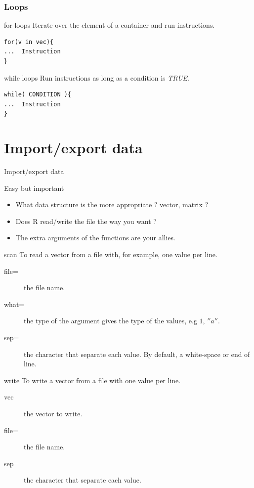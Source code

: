 \documentclass[10pt]{beamer}
\newenvironment{xframe}[2][]
  {\begin{frame}[fragile,environment=xframe,#1]
  \frametitle{#2}}
  {\end{frame}}
\begin{document}

\begin{xframe}{Loops}
  \begin{block}{{\sf for} loops}
    Iterate over the element of a container and run instructions.
\begin{verbatim}
for(v in vec){
...  Instruction
}
\end{verbatim}  
  \end{block}
  \begin{block}{{\sf while} loops}
    Run instructions as long as a condition is {\it TRUE}.
\begin{verbatim}
while( CONDITION ){
...  Instruction
}
\end{verbatim}  
  \end{block}
\end{xframe}




\section{Import/export data}

\begin{frame}[shrink=5]{Import/export data}
  \begin{block}{Easy but important}
    \begin{itemize}
    \item What data structure is the more appropriate ? {\sf vector}, {\sf matrix} ?
    \item Does R read/write the file the way you want ?
    \item The extra arguments of the functions are your allies.
    \end{itemize}
  \end{block}
  \begin{block}{{\sf scan}}
    To read a {\sf vector} from a file with, for example, one value per line.
    \begin{description}
    \item[file=] the file name.
    \item[what=] the type of the argument gives the type of the values, e.g $1$, $''a''$.
    \item[sep=] the character that separate each value. By default, a white-space or end of line.
    \end{description}
  \end{block}
  \begin{block}{{\sf write}}
    To write a {\sf vector} from a file with one value per line.
    \begin{description}
    \item[vec] the vector to write.
    \item[file=] the file name.
    \item[sep=] the character that separate each value.
    \end{description}
  \end{block}
\end{frame}
\end{document}
